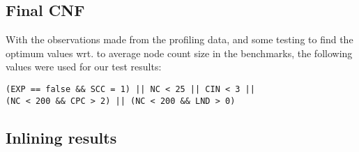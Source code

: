 \subsection{Final CNF}
\label{sub:res:final_cnf}

With the observations made from the profiling data, and some testing to find the
optimum values wrt. to average node count size in the benchmarks, the following
values were used for our test results:

\begin{centering}
\lstinline!(EXP == false && SCC = 1) || NC < 25 || CIN < 3 ||! \\
\lstinline!(NC < 200 && CPC > 2) || (NC < 200 && LND > 0)! \\
\end{centering}

\subsection{Inlining results}
\label{sub:res:inlining}


